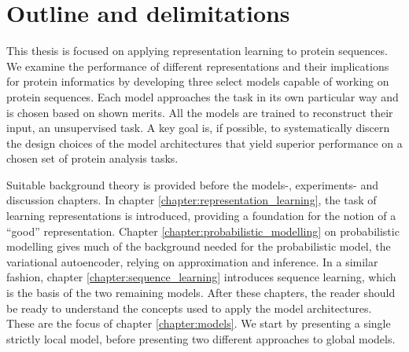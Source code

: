 

\section{Outline and delimitations}
This thesis is focused on applying representation learning to protein sequences. We examine the performance of different representations and their implications for protein informatics by developing three select models capable of working on protein sequences. Each model approaches the task in its own particular way and is chosen based on shown merits. All the models are trained to reconstruct their input, an unsupervised task. A key goal is, if possible, to systematically discern the design choices of the model architectures that yield superior performance on a chosen set of protein analysis tasks.%

Suitable background theory is provided before the models-, experiments- and discussion chapters. In chapter \ref{chapter:representation_learning}, the task of learning representations is introduced, providing a foundation for the notion of a ``good'' representation. Chapter \ref{chapter:probabilistic_modelling} on probabilistic modelling gives much of the background needed for the probabilistic model, the variational autoencoder, relying on approximation and inference. In a similar fashion, chapter \ref{chapter:sequence_learning} introduces sequence learning, which is the basis of the two remaining models. After these chapters, the reader should be ready to understand the concepts used to apply the model architectures. These are the focus of chapter \ref{chapter:models}. We start by presenting a single strictly local model, before presenting two different approaches to global models.

